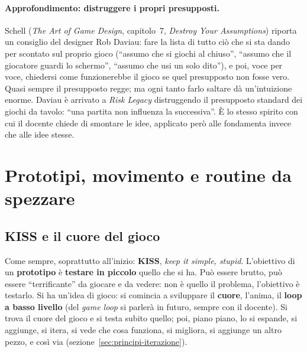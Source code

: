 \paragraph{Approfondimento: distruggere i propri presupposti.} Schell
(\emph{The Art of Game Design}, capitolo~7, \emph{Destroy Your Assumptions})
riporta un consiglio del designer Rob Daviau: fare la lista di tutto ciò che
si sta dando per scontato sul proprio gioco (``assumo che si giochi al
chiuso'', ``assumo che il giocatore guardi lo schermo'', ``assumo che usi un
solo dito''), e poi, voce per voce, chiedersi come funzionerebbe il gioco se
quel presupposto non fosse vero. Quasi sempre il presupposto regge; ma ogni
tanto farlo saltare dà un'intuizione enorme. Daviau è arrivato a \emph{Risk
Legacy} distruggendo il presupposto standard dei giochi da tavolo: ``una
partita non influenza la successiva''. È lo stesso spirito con cui il docente
chiede di smontare le idee, applicato però alle fondamenta invece che alle
idee stesse.

\section{Prototipi, movimento e routine da spezzare}
\label{sec:kiss-routine}

\subsection{KISS e il cuore del gioco}

Come sempre, soprattutto all'inizio: \textbf{KISS}, \emph{keep it simple,
stupid}. L'obiettivo di un \textbf{prototipo} è \textbf{testare in piccolo}
quello che si ha. Può essere brutto, può essere ``terrificante'' da giocare
e da vedere: non è quello il problema, l'obiettivo è testarlo. Si ha
un'idea di gioco: si comincia a sviluppare il \textbf{cuore}, l'anima, il
\textbf{loop a basso livello} (del \emph{game loop} si parlerà in futuro,
sempre con il docente). Si trova il cuore del gioco e si testa subito quello;
poi, piano piano, lo si espande, si aggiunge, si itera, si vede che cosa
funziona, si migliora, si aggiunge un altro pezzo, e così via
(sezione~\ref{sec:principi-iterazione}).

